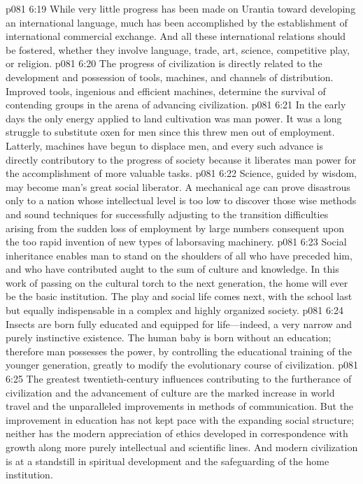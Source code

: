 \vs p081 6:19 While very little progress has been made on Urantia toward developing an international language, much has been accomplished by the establishment of international commercial exchange. And all these international relations should be fostered, whether they involve language, trade, art, science, competitive play, or religion.
\pc \vs p081 6:20 \bibnobreakspace {} The progress of civilization is directly related to the development and possession of tools, machines, and channels of distribution. Improved tools, ingenious and efficient machines, determine the survival of contending groups in the arena of advancing civilization.
\vs p081 6:21 In the early days the only energy applied to land cultivation was man power. It was a long struggle to substitute oxen for men since this threw men out of employment. Latterly, machines have begun to displace men, and every such advance is directly contributory to the progress of society because it liberates man power for the accomplishment of more valuable tasks.
\vs p081 6:22 Science, guided by wisdom, may become man’s great social liberator. A mechanical age can prove disastrous only to a nation whose intellectual level is too low to discover those wise methods and sound techniques for successfully adjusting to the transition difficulties arising from the sudden loss of employment by large numbers consequent upon the too rapid invention of new types of laborsaving machinery.
\pc \vs p081 6:23 \bibnobreakspace {} Social inheritance enables man to stand on the shoulders of all who have preceded him, and who have contributed aught to the sum of culture and knowledge. In this work of passing on the cultural torch to the next generation, the home will ever be the basic institution. The play and social life comes next, with the school last but equally indispensable in a complex and highly organized society.
\vs p081 6:24 Insects are born fully educated and equipped for life---indeed, a very narrow and purely instinctive existence. The human baby is born without an education; therefore man possesses the power, by controlling the educational training of the younger generation, greatly to modify the evolutionary course of civilization.
\vs p081 6:25 The greatest twentieth\hyp{}century influences contributing to the furtherance of civilization and the advancement of culture are the marked increase in world travel and the unparalleled improvements in methods of communication. But the improvement in education has not kept pace with the expanding social structure; neither has the modern appreciation of ethics developed in correspondence with growth along more purely intellectual and scientific lines. And modern civilization is at a standstill in spiritual development and the safeguarding of the home institution.
